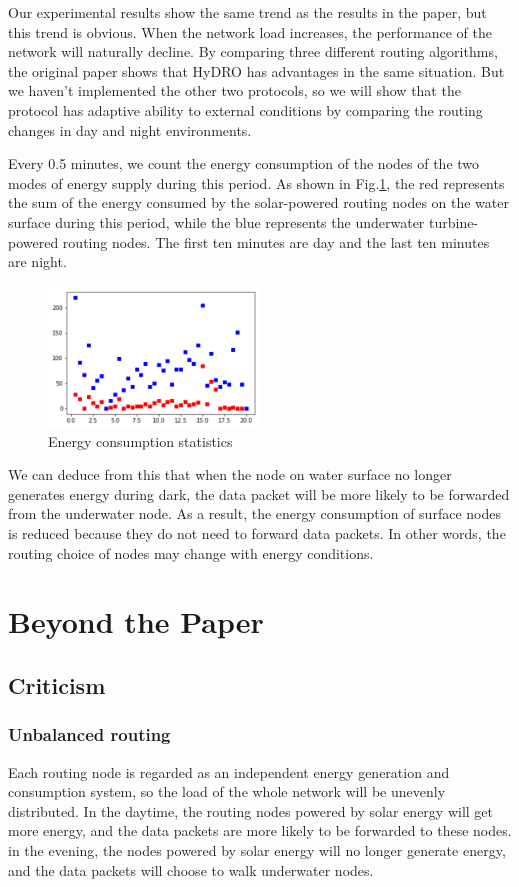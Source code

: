 \documentclass[10pt,twocolumn,letterpaper]{article}
\begin{document}
	Our experimental results show the same trend as the results in the paper, but this trend is obvious. When the network load increases, the performance of the network will naturally decline. By comparing three different routing algorithms, the original paper shows that HyDRO has advantages in the same situation. But we haven't implemented the other two protocols, so we will show that the protocol has adaptive ability to external conditions by comparing the routing changes in day and night environments.
	
	Every 0.5 minutes, we count the energy consumption of the nodes of the two modes of energy supply during this period. As shown in Fig.\ref{fig:change}, the red represents the sum of the energy consumed by the solar-powered routing nodes on the water surface during this period, while the blue represents the underwater turbine-powered routing nodes. The first ten minutes are day and the last ten minutes are night.
	\begin{figure}[bthp]
		\centering
		\includegraphics[width=0.5\textwidth]{figure/routing-change.png}
		\caption{Energy consumption statistics}
		\label{fig:change}
	\end{figure}

	We can deduce from this that when the node on water surface no longer generates energy during dark, the data packet will be more likely to be forwarded from the underwater node. As a result, the energy consumption of surface nodes is reduced because they do not need to forward data packets. In other words, the routing choice of nodes may change with energy conditions.

\section{Beyond the Paper}

\subsection{Criticism}
\subsubsection{Unbalanced routing}
	Each routing node is regarded as an independent energy generation and consumption system, so the load of the whole network will be unevenly distributed. In the daytime, the routing nodes powered by solar energy will get more energy, and the data packets are more likely to be forwarded to these nodes. in the evening, the nodes powered by solar energy will no longer generate energy, and the data packets will choose to walk underwater nodes.
	
\end{document}
